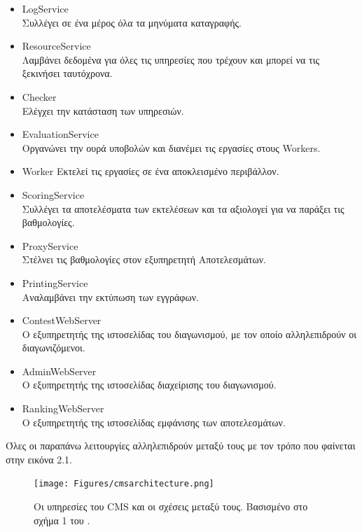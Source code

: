 \documentclass[diploma]{softlab-thesis}
\begin{document}
\begin{itemize}
    \setlength\itemsep{0em}
    \item LogService \\
      Συλλέγει σε ένα μέρος όλα τα μηνύματα καταγραφής.
    \item ResourceService \\
      Λαμβάνει δεδομένα για όλες τις υπηρεσίες που τρέχουν και μπορεί να τις
      ξεκινήσει ταυτόχρονα.
    \item Checker \\
      Ελέγχει την κατάσταση των υπηρεσιών.
    \item EvaluationService \\
      Οργανώνει την ουρά υποβολών και διανέμει τις εργασίες στους Workers.
    \item Worker
      Εκτελεί τις εργασίες σε ένα αποκλεισμένο περιβάλλον.
    \item ScoringService \\
      Συλλέγει τα αποτελέσματα των εκτελέσεων και τα αξιολογεί για να παράξει
      τις βαθμολογίες.
    \item ProxyService \\
      Στέλνει τις βαθμολογίες στον εξυπηρετητή Αποτελεσμάτων.
    \item PrintingService \\
      Αναλαμβάνει την εκτύπωση των εγγράφων.
    \item ContestWebServer \\
      Ο εξυπηρετητής της ιστοσελίδας του διαγωνισμού, με τον οποίο αλληλεπιδρούν
      οι διαγωνιζόμενοι.
    \item AdminWebServer \\
      Ο εξυπηρετητής της ιστοσελίδας διαχείρισης του διαγωνισμού.
    \item RankingWebServer \\
      Ο εξυπηρετητής της ιστοσελίδας εμφάνισης των αποτελεσμάτων.
\end{itemize}

\bigskip

Όλες οι παραπάνω λειτουργίες αλληλεπιδρούν μεταξύ τους με τον τρόπο που φαίνεται
στην εικόνα 2.1.

\begin{figure}
  \centering
  \texttt{[image: Figures/cmsarchitecture.png]}
  \caption[Η αρχιτεκτονική του CMS]{Οι υπηρεσίες του CMS και οι σχέσεις μεταξύ τους.
  Βασισμένο στο σχήμα 1 του \cite{maggiolo2012introducing}.}
\end{figure}
\end{document}
